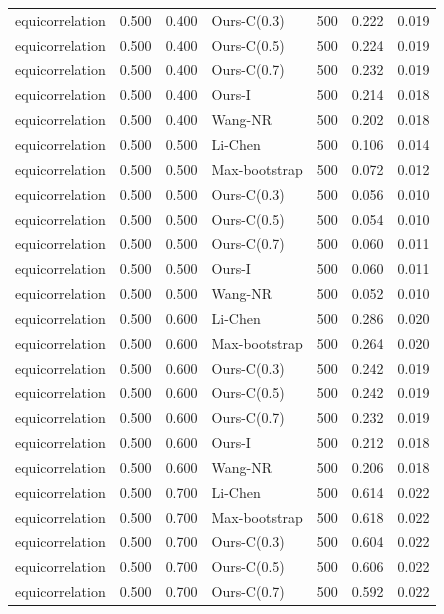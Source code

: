 \begin{tabular}{lrrlrrr}
equicorrelation & 0.500 & 0.400 & Ours-C(0.3) & 500 & 0.222 & 0.019 \\
equicorrelation & 0.500 & 0.400 & Ours-C(0.5) & 500 & 0.224 & 0.019 \\
equicorrelation & 0.500 & 0.400 & Ours-C(0.7) & 500 & 0.232 & 0.019 \\
equicorrelation & 0.500 & 0.400 & Ours-I & 500 & 0.214 & 0.018 \\
equicorrelation & 0.500 & 0.400 & Wang-NR & 500 & 0.202 & 0.018 \\
equicorrelation & 0.500 & 0.500 & Li-Chen & 500 & 0.106 & 0.014 \\
equicorrelation & 0.500 & 0.500 & Max-bootstrap & 500 & 0.072 & 0.012 \\
equicorrelation & 0.500 & 0.500 & Ours-C(0.3) & 500 & 0.056 & 0.010 \\
equicorrelation & 0.500 & 0.500 & Ours-C(0.5) & 500 & 0.054 & 0.010 \\
equicorrelation & 0.500 & 0.500 & Ours-C(0.7) & 500 & 0.060 & 0.011 \\
equicorrelation & 0.500 & 0.500 & Ours-I & 500 & 0.060 & 0.011 \\
equicorrelation & 0.500 & 0.500 & Wang-NR & 500 & 0.052 & 0.010 \\
equicorrelation & 0.500 & 0.600 & Li-Chen & 500 & 0.286 & 0.020 \\
equicorrelation & 0.500 & 0.600 & Max-bootstrap & 500 & 0.264 & 0.020 \\
equicorrelation & 0.500 & 0.600 & Ours-C(0.3) & 500 & 0.242 & 0.019 \\
equicorrelation & 0.500 & 0.600 & Ours-C(0.5) & 500 & 0.242 & 0.019 \\
equicorrelation & 0.500 & 0.600 & Ours-C(0.7) & 500 & 0.232 & 0.019 \\
equicorrelation & 0.500 & 0.600 & Ours-I & 500 & 0.212 & 0.018 \\
equicorrelation & 0.500 & 0.600 & Wang-NR & 500 & 0.206 & 0.018 \\
equicorrelation & 0.500 & 0.700 & Li-Chen & 500 & 0.614 & 0.022 \\
equicorrelation & 0.500 & 0.700 & Max-bootstrap & 500 & 0.618 & 0.022 \\
equicorrelation & 0.500 & 0.700 & Ours-C(0.3) & 500 & 0.604 & 0.022 \\
equicorrelation & 0.500 & 0.700 & Ours-C(0.5) & 500 & 0.606 & 0.022 \\
equicorrelation & 0.500 & 0.700 & Ours-C(0.7) & 500 & 0.592 & 0.022 \\

\end{tabular}
